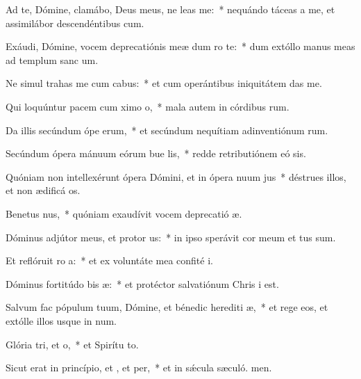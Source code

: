 \item Ad te, Dómine, clamábo, Deus meus, ne leas  me:~* nequándo táceas a me, et assimilábor descendéntibus  cum.
\item Exáudi, Dómine, vocem deprecatiónis meæ dum ro  te:~* dum extóllo manus meas ad templum sanc um.
\item Ne simul trahas me cum cabus:~* et cum operántibus iniquitátem  das me.
\item Qui loquúntur pacem cum ximo o,~* mala autem in córdibus rum.
\item Da illis secúndum ópe erum,~* et secúndum nequítiam adinventiónum rum.
\item Secúndum ópera mánuum eórum bue lis,~* redde retributiónem eó sis.
\item Quóniam non intellexérunt ópera Dómini, et in ópera nuum jus~* déstrues illos, et non ædificá os.
\item Benetus nus,~* quóniam exaudívit vocem deprecatió æ.
\item Dóminus adjútor meus, et protor us:~* in ipso sperávit cor meum et tus sum.
\item Et reflóruit ro a:~* et ex voluntáte mea confité i.
\item Dóminus fortitúdo bis æ:~* et protéctor salvatiónum Chris i est.
\item Salvum fac pópulum tuum, Dómine, et bénedic herediti æ,~* et rege eos, et extólle illos usque in num.
\item Glória tri, et o,~* et Spirítu to.
\item Sicut erat in princípio, et , et per,~* et in sǽcula sæculó. men.
